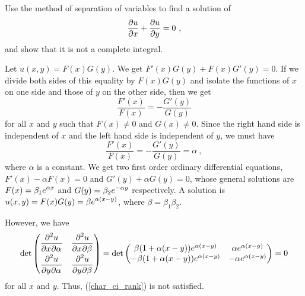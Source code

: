 \begin{egg}
Use the method of separation of variables to find a solution of
\[
\pdydx{u}{x} + \pdydx{u}{y} = 0 \ ,
\]
and show that it is not a complete integral.

Let $u(x,y) = F(x)G(y)$.  We get $F'(x) G(y) + F(x) G'(y) = 0$.  If we
divide both sides of this equality by $F(x)G(y)$ and isolate the
functions of $x$ on one side and those of $y$ on the other side, then we
get
\[
\frac{F'(x)}{F(x)} = - \frac{G'(y)}{G(y)}
\]
for all $x$ and $y$ such that $F(x) \neq 0$ and $G(x) \neq 0$.  Since
the right hand side is independent of $x$ and the left hand side is
independent of $y$, we must have
\[
\frac{F'(x)}{F(x)} = - \frac{G'(y)}{G(y)} = \alpha \ ,
\]
where $\alpha$ is a constant.  We get two first order ordinary
differential equations, $F'(x) -\alpha F(x) = 0$ and
$G'(y) + \alpha G(y) = 0$,
whose general solutions are $\DS F(x) = \beta_1 e^{\alpha x}$ and
$\DS G(y) = \beta_2 e^{-\alpha y}$ respectively.  A solution is
$\DS u(x,y) = F(x)G(y) = \beta e^{\alpha(x-y)}$, where
$\beta = \beta_1 \beta_2$.

However, we have
\[
\det
\begin{pmatrix}
\DS \pdydxnm{u}{x}{\alpha}{2}{}{} &
\DS \pdydxnm{u}{x}{\beta}{2}{}{} \\[0.7em]
\DS \pdydxnm{u}{y}{\alpha}{2}{}{} &
\DS \pdydxnm{u}{y}{\beta}{2}{}{}
\end{pmatrix}
= \det
\begin{pmatrix}
\beta (1+\alpha (x-y)) e^{\alpha(x-y)} & \alpha e^{\alpha(x-y)} \\
-\beta(1+\alpha (x-y)) e^{\alpha(x-y)} & -\alpha e^{\alpha(x-y)}
\end{pmatrix} = 0
\]
for all $x$ and $y$. Thus, (\ref{char_ci_rank}) is not satisfied.
\end{egg}

